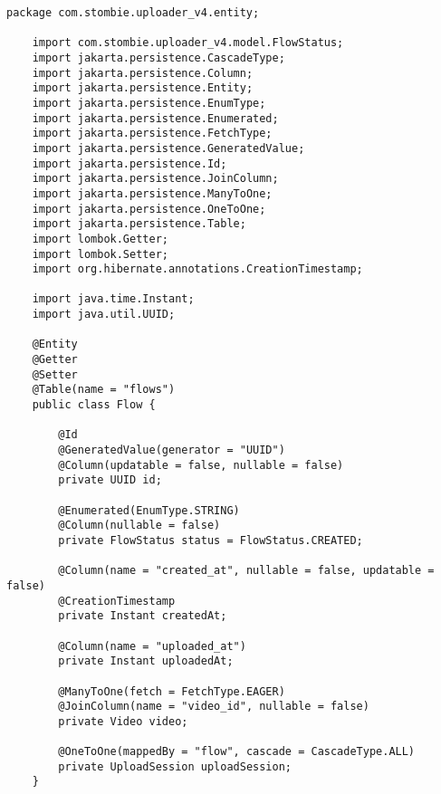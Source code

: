 \begin{lstlisting}[caption={Flow.java}]
	package com.stombie.uploader_v4.entity;
	
	import com.stombie.uploader_v4.model.FlowStatus;
	import jakarta.persistence.CascadeType;
	import jakarta.persistence.Column;
	import jakarta.persistence.Entity;
	import jakarta.persistence.EnumType;
	import jakarta.persistence.Enumerated;
	import jakarta.persistence.FetchType;
	import jakarta.persistence.GeneratedValue;
	import jakarta.persistence.Id;
	import jakarta.persistence.JoinColumn;
	import jakarta.persistence.ManyToOne;
	import jakarta.persistence.OneToOne;
	import jakarta.persistence.Table;
	import lombok.Getter;
	import lombok.Setter;
	import org.hibernate.annotations.CreationTimestamp;
	
	import java.time.Instant;
	import java.util.UUID;
	
	@Entity
	@Getter
	@Setter
	@Table(name = "flows")
	public class Flow {
		
		@Id
		@GeneratedValue(generator = "UUID")
		@Column(updatable = false, nullable = false)
		private UUID id;
		
		@Enumerated(EnumType.STRING)
		@Column(nullable = false)
		private FlowStatus status = FlowStatus.CREATED;
		
		@Column(name = "created_at", nullable = false, updatable = false)
		@CreationTimestamp
		private Instant createdAt;
		
		@Column(name = "uploaded_at")
		private Instant uploadedAt;
		
		@ManyToOne(fetch = FetchType.EAGER)
		@JoinColumn(name = "video_id", nullable = false)
		private Video video;
		
		@OneToOne(mappedBy = "flow", cascade = CascadeType.ALL)
		private UploadSession uploadSession;
	}
\end{lstlisting}

